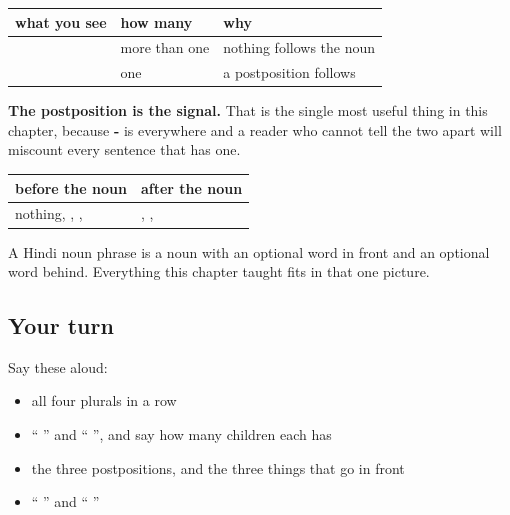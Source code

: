 \begin{grammarlens}[title={Grammar Lens: the ending that means two things}]
\noindent
\begin{tabularx}{\linewidth}{@{}>{\raggedright\arraybackslash}X>{\raggedright\arraybackslash}X>{\raggedright\arraybackslash}X@{}}
\toprule
\textbf{what you see} & \textbf{how many} & \textbf{why} \\
\midrule
\hi{बच्चे} \hi{लंबे} \hi{हैं} & more than one & nothing follows the noun \\
\hi{बच्चे} \hi{को} & one & a postposition follows \\
\bottomrule
\end{tabularx}

\textbf{The postposition is the signal.} That is the single most useful thing in this chapter, because \textbf{-} is everywhere and a reader who cannot tell the two apart will miscount every sentence that has one.
\end{grammarlens}

\begin{grammarlens}[title={Grammar Lens: the space in front of the noun}]
\noindent
\begin{tabularx}{\linewidth}{@{}>{\raggedright\arraybackslash}X>{\raggedright\arraybackslash}X@{}}
\toprule
\textbf{before the noun} & \textbf{after the noun} \\
\midrule
nothing, \hi{एक}, \hi{यह}, \hi{वह} & \hi{पर}, \hi{से}, \hi{को} \\
\bottomrule
\end{tabularx}

A Hindi noun phrase is a noun with an optional word in front and an optional word behind. Everything this chapter taught fits in that one picture.
\end{grammarlens}

\subsection*{Your turn}
Say these aloud:

\begin{itemize}
\raggedright
  \item all four plurals in a row
  \item \textquotedblleft{} \textquotedblright{} and \textquotedblleft{}  \textquotedblright{}, and say how many children each has
  \item the three postpositions, and the three things that go in front
  \item \textquotedblleft{} \textquotedblright{} and \textquotedblleft{} \textquotedblright{}
\end{itemize}

